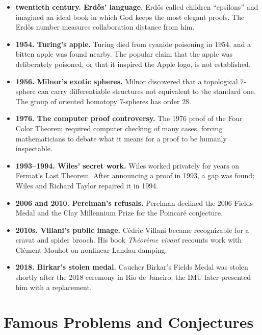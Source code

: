 \begin{itemize}
              by moving each guest to another numbered room.
        \item \textbf{twentieth century. Erd\H{o}s' language.} Erd\H{o}s called children
              ``epsilons'' and imagined an ideal book in which God keeps the
              most elegant proofs. The Erd\H{o}s number measures collaboration
              distance from him.
        \item \textbf{1954. Turing's apple.} Turing died from cyanide poisoning in
              1954, and a bitten apple was found nearby. The popular claim that
              the apple was deliberately poisoned, or that it inspired the
              Apple logo, is not established.
        \item \textbf{1956. Milnor's exotic spheres.} Milnor discovered that a
              topological $7$-sphere can carry differentiable structures not
              equivalent to the standard one. The group of oriented homotopy
              $7$-spheres has order $28$.
        \item \textbf{1976. The computer proof controversy.} The 1976 proof of the
              Four Color Theorem required computer checking of many cases,
              forcing mathematicians to debate what it means for a proof to be
              humanly inspectable.
        \item \textbf{1993--1994. Wiles' secret work.} Wiles worked privately for years on
              Fermat's Last Theorem. After announcing a proof in 1993, a gap was
              found; Wiles and Richard Taylor repaired it in 1994.
        \item \textbf{2006 and 2010. Perelman's refusals.} Perelman declined the 2006 Fields
              Medal and the Clay Millennium Prize for the Poincaré conjecture.
        \item \textbf{2010s. Villani's public image.} Cédric Villani became recognizable
              for a cravat and spider brooch. His book
              \textit{Théorème vivant} recounts work with Clément Mouhot on
              nonlinear Landau damping.
        \item \textbf{2018. Birkar's stolen medal.} Caucher Birkar's Fields Medal was
              stolen shortly after the 2018 ceremony in Rio de Janeiro; the IMU
              later presented him with a replacement.
    \end{itemize}

    \chapter{Famous Problems and Conjectures}

